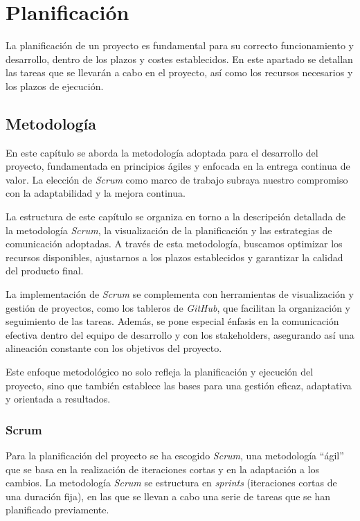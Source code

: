 \chapter{Planificación}\label{chap:planif}
La planificación de un proyecto es fundamental para su correcto funcionamiento y desarrollo,
dentro de los plazos y costes establecidos. En este apartado se detallan las tareas que se
llevarán a cabo en el proyecto, así como los recursos necesarios y los plazos de ejecución.

\section{Metodología}\label{sec:metodología}
En este capítulo se aborda la metodología adoptada para el desarrollo del proyecto, fundamentada
en principios ágiles y enfocada en la entrega continua de valor. La elección de \textit{Scrum}
como marco de trabajo subraya nuestro compromiso con la adaptabilidad y la mejora continua.

La estructura de este capítulo se organiza en torno a la descripción detallada de la metodología
\textit{Scrum}, la visualización de la planificación y las estrategias de comunicación adoptadas.
A través de esta metodología, buscamos optimizar los recursos disponibles, ajustarnos a los plazos
establecidos y garantizar la calidad del producto final.

La implementación de \textit{Scrum} se complementa con herramientas de visualización y gestión de
proyectos, como los tableros de \textit{GitHub}, que facilitan la organización y seguimiento de
las tareas. Además, se pone especial énfasis en la comunicación efectiva dentro del equipo de
desarrollo y con los stakeholders, asegurando así una alineación constante con los objetivos del
proyecto.

Este enfoque metodológico no solo refleja la planificación y ejecución del proyecto, sino que
también establece las bases para una gestión eficaz, adaptativa y orientada a resultados.

\subsection{Scrum}\label{subsec:scrum}
Para la planificación del proyecto se ha escogido \textit{Scrum}, una metodología ``ágil'' que se
basa en la realización de iteraciones cortas y en la adaptación a los cambios. La metodología
\textit{Scrum} se estructura en \textit{sprints} (iteraciones cortas de una duración fija),
en las que se llevan a cabo una serie de tareas que se han planificado previamente.

